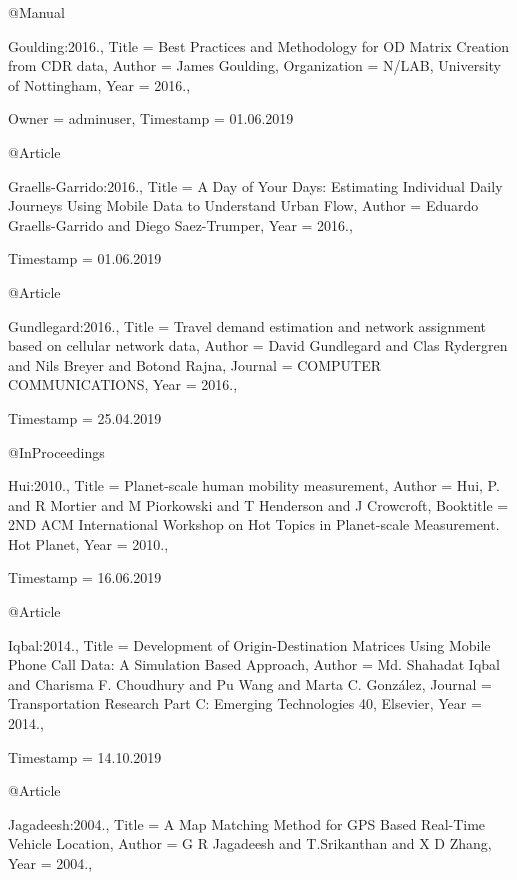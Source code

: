 {@Manual{Goulding:2016.,
  Title                    = {{Best Practices and Methodology for OD Matrix Creation from CDR data}},
  Author                   = {James Goulding},
  Organization             = {N/LAB, University of Nottingham},
  Year                     = {2016.},

  Owner                    = {adminuser},
  Timestamp                = {01.06.2019}
}

@Article{Graells-Garrido:2016.,
  Title                    = {{A Day of Your Days: Estimating Individual Daily Journeys Using Mobile Data to Understand Urban Flow}},
  Author                   = {Eduardo Graells-Garrido and Diego Saez-Trumper},
  Year                     = {2016.},

  Timestamp                = {01.06.2019}
}

@Article{Gundlegard:2016.,
  Title                    = {Travel demand estimation and network assignment based on cellular network data},
  Author                   = {David Gundlegard and Clas Rydergren and Nils Breyer and Botond Rajna},
  Journal                  = {COMPUTER COMMUNICATIONS},
  Year                     = {2016.},

  Timestamp                = {25.04.2019}
}

@InProceedings{Hui:2010.,
  Title                    = {Planet-scale human mobility measurement},
  Author                   = {Hui, P. and R Mortier and M Piorkowski and T Henderson and J Crowcroft},
  Booktitle                = {2ND ACM International Workshop on Hot Topics in Planet-scale Measurement. Hot Planet},
  Year                     = {2010.},

  Timestamp                = {16.06.2019}
}

@Article{Iqbal:2014.,
  Title                    = {{Development of Origin-Destination Matrices Using Mobile Phone Call Data: A Simulation Based Approach}},
  Author                   = {Md. Shahadat Iqbal and Charisma F. Choudhury and Pu Wang and Marta C. Gonz\'alez},
  Journal                  = {{Transportation Research Part C: Emerging Technologies 40, Elsevier}},
  Year                     = {2014.},

  Timestamp                = {14.10.2019}
}

@Article{Jagadeesh:2004.,
  Title                    = {{A Map Matching Method for GPS Based Real-Time Vehicle Location}},
  Author                   = {G R Jagadeesh and T.Srikanthan and X D Zhang},
  Year                     = {2004.},

}}
